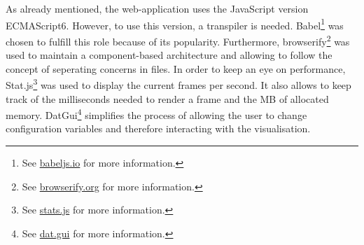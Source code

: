 As already mentioned, the web-application uses the JavaScript version ECMAScript6. However, to use this version, a transpiler is needed. Babel\footnote{See \href{https://babeljs.io/}{babeljs.io} for more information.} was chosen to fulfill this role because of its popularity. Furthermore, browserify\footnote{See \href{http://browserify.org/}{browserify.org} for more information.} was used to maintain a component-based architecture and allowing to follow the concept of seperating concerns in files.
In order to keep an eye on performance, Stat.js\footnote{See \href{https://github.com/mrdoob/stats.js/}{stats.js} for more information.} was used to display the current frames per second. It also allows to keep track of the milliseconds needed to render a frame and the \ac{MB} of allocated memory. DatGui\footnote{See \href{https://github.com/dataarts/dat.gui}{dat.gui} for more information.} simplifies the process of allowing the user to change configuration variables and therefore interacting with the visualisation.

